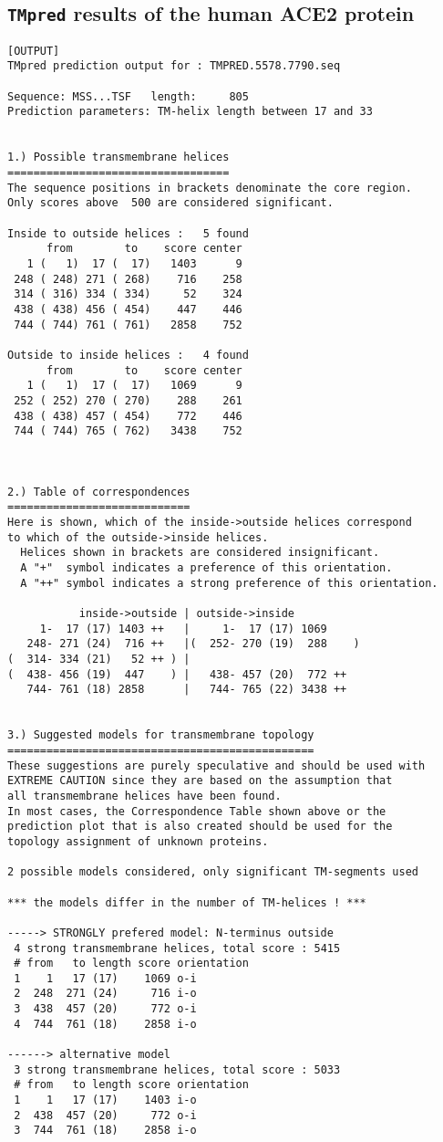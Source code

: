 \documentclass[en,black,10pt,normal]{elegantnote}
\begin{document}
\subsection{\texttt{TMpred} results of the human ACE2 protein}
\begin{lstlisting}[frame=single]
[OUTPUT]
TMpred prediction output for : TMPRED.5578.7790.seq
 
Sequence: MSS...TSF   length:     805
Prediction parameters: TM-helix length between 17 and 33
 
 
1.) Possible transmembrane helices
==================================
The sequence positions in brackets denominate the core region.
Only scores above  500 are considered significant.
 
Inside to outside helices :   5 found
      from        to    score center
   1 (   1)  17 (  17)   1403      9
 248 ( 248) 271 ( 268)    716    258
 314 ( 316) 334 ( 334)     52    324
 438 ( 438) 456 ( 454)    447    446
 744 ( 744) 761 ( 761)   2858    752

Outside to inside helices :   4 found
      from        to    score center
   1 (   1)  17 (  17)   1069      9
 252 ( 252) 270 ( 270)    288    261
 438 ( 438) 457 ( 454)    772    446
 744 ( 744) 765 ( 762)   3438    752


 
2.) Table of correspondences
============================
Here is shown, which of the inside->outside helices correspond
to which of the outside->inside helices.
  Helices shown in brackets are considered insignificant.
  A "+"  symbol indicates a preference of this orientation.
  A "++" symbol indicates a strong preference of this orientation.
 
           inside->outside | outside->inside
     1-  17 (17) 1403 ++   |     1-  17 (17) 1069      
   248- 271 (24)  716 ++   |(  252- 270 (19)  288    ) 
(  314- 334 (21)   52 ++ ) |
(  438- 456 (19)  447    ) |   438- 457 (20)  772 ++   
   744- 761 (18) 2858      |   744- 765 (22) 3438 ++   


3.) Suggested models for transmembrane topology
===============================================
These suggestions are purely speculative and should be used with
EXTREME CAUTION since they are based on the assumption that
all transmembrane helices have been found.
In most cases, the Correspondence Table shown above or the
prediction plot that is also created should be used for the
topology assignment of unknown proteins.

2 possible models considered, only significant TM-segments used

*** the models differ in the number of TM-helices ! ***

-----> STRONGLY prefered model: N-terminus outside
 4 strong transmembrane helices, total score : 5415
 # from   to length score orientation
 1    1   17 (17)    1069 o-i
 2  248  271 (24)     716 i-o
 3  438  457 (20)     772 o-i
 4  744  761 (18)    2858 i-o

------> alternative model
 3 strong transmembrane helices, total score : 5033
 # from   to length score orientation
 1    1   17 (17)    1403 i-o
 2  438  457 (20)     772 o-i
 3  744  761 (18)    2858 i-o
\end{lstlisting}

{}
\end{document}
